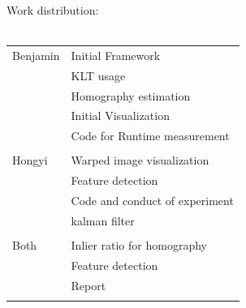 \documentclass[10pt,conference,compsocconf]{IEEEtran}
\begin{document}
\appendix
Work distribution:\\\\
\begin{tabular}{l l}
Benjamin & Initial Framework \\
& KLT usage \\
& Homography estimation \\
& Initial Visualization \\
& Code for Runtime measurement\\
\\
Hongyi 
& Warped image visualization\\
& Feature detection \\
& Code and conduct of experiment\\
& kalman filter\\
\\
Both & Inlier ratio for homography \\
& Feature detection \\
& Report\\
\\
\end{tabular} 
\end{document}
